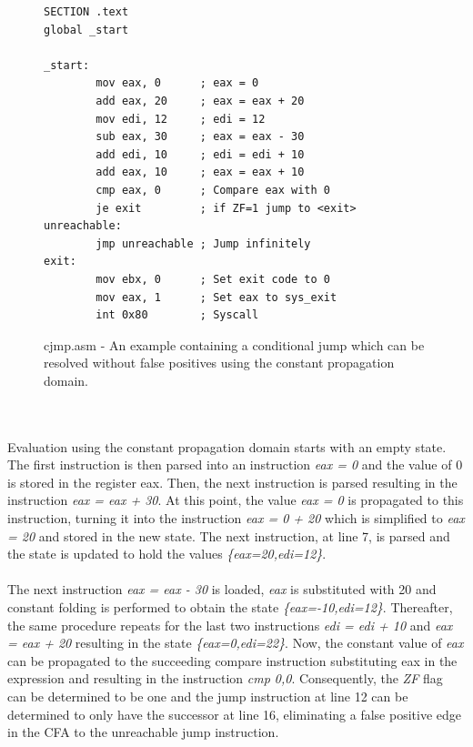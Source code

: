 \documentclass{kththesis}
\renewcommand{\it}[1]{\textit{#1}}
\begin{document}
\begin{figure}[!ht]
    \centering
\begin{tcolorbox}
\begin{verbatim}
SECTION .text
global _start

_start:
        mov eax, 0      ; eax = 0
        add eax, 20     ; eax = eax + 20
        mov edi, 12     ; edi = 12
        sub eax, 30     ; eax = eax - 30
        add edi, 10     ; edi = edi + 10
        add eax, 10     ; eax = eax + 10
        cmp eax, 0      ; Compare eax with 0
        je exit         ; if ZF=1 jump to <exit>
unreachable:            
        jmp unreachable ; Jump infinitely
exit:
        mov ebx, 0      ; Set exit code to 0
        mov eax, 1      ; Set eax to sys_exit
        int 0x80        ; Syscall
\end{verbatim}
\end{tcolorbox}
\caption{cjmp.asm - An example containing a conditional jump which can be resolved without false positives using the constant propagation domain.}
    \label{fig:cjmp.asm}
\end{figure}
\noindent
\\ \\
Evaluation using the constant propagation domain starts with an empty state. The first instruction is then parsed into an instruction \it{eax = 0} and the value of 0 is stored in the register eax. Then, the next instruction is parsed resulting in the instruction \it{eax = eax + 30}. At this point, the value \it{eax = 0} is propagated to this instruction, turning it into the instruction \it{eax = 0 + 20} which is simplified to \it{eax = 20} and stored in the new state. The next instruction, at line 7, is parsed and the state is updated to hold the values \it{\{eax=20,edi=12\}}.
\\ \\
The next instruction \it{eax = eax - 30} is loaded, \it{eax} is substituted with 20 and constant folding is performed to obtain the state \it{\{eax=-10,edi=12\}}. Thereafter, the same procedure repeats for the last two instructions \it{edi = edi + 10} and \it{eax = eax + 20} resulting in the state \it{\{eax=0,edi=22\}}. Now, the constant value of \it{eax} can be propagated to the succeeding compare instruction substituting eax in the expression and resulting in the instruction \it{cmp 0,0}. Consequently, the \it{ZF} flag can be determined to be one and the jump instruction at line 12 can be determined to only have the successor at line 16, eliminating a false positive edge in the CFA to the unreachable jump instruction. 
\end{document}
